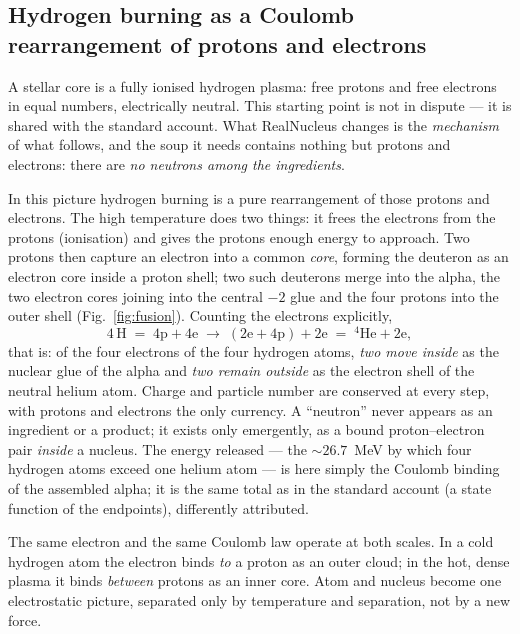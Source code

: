 \documentclass[11pt]{article}
\begin{document}
\subsection{Hydrogen burning as a Coulomb rearrangement of protons and electrons}

A stellar core is a fully ionised hydrogen plasma: free protons and free electrons in equal
numbers, electrically neutral. This starting point is not in dispute --- it is shared with the
standard account. What RealNucleus changes is the \emph{mechanism} of what follows, and the soup
it needs contains nothing but protons and electrons: there are \emph{no neutrons among the
ingredients}.

In this picture hydrogen burning is a pure rearrangement of those protons and electrons. The high
temperature does two things: it frees the electrons from the protons (ionisation) and gives the
protons enough energy to approach. Two protons then capture an electron into a common \emph{core},
forming the deuteron as an electron core inside a proton shell; two such deuterons merge into the
alpha, the two electron cores joining into the central $-2$ glue and the four protons into the
outer shell (Fig.~\ref{fig:fusion}). Counting the electrons explicitly,
\begin{equation}
  4\,\mathrm{H} \;=\; 4\mathrm{p}+4\mathrm{e}
  \;\longrightarrow\; (2\mathrm{e}+4\mathrm{p}) + 2\mathrm{e}
  \;=\; {}^4\mathrm{He}+2\mathrm{e},
\end{equation}
that is: of the four electrons of the four hydrogen atoms, \emph{two move inside} as the nuclear
glue of the alpha and \emph{two remain outside} as the electron shell of the neutral helium atom.
Charge and particle number are conserved at every step, with protons and electrons the only
currency. A ``neutron'' never appears as an ingredient or a product; it exists only emergently, as
a bound proton--electron pair \emph{inside} a nucleus. The energy released --- the ${\sim}26.7$~MeV
by which four hydrogen atoms exceed one helium atom --- is here simply the Coulomb binding of the
assembled alpha; it is the same total as in the standard account (a state function of the
endpoints), differently attributed.

The same electron and the same Coulomb law operate at both scales. In a cold hydrogen atom the
electron binds \emph{to} a proton as an outer cloud; in the hot, dense plasma it binds
\emph{between} protons as an inner core. Atom and nucleus become one electrostatic picture,
separated only by temperature and separation, not by a new force.
\end{document}
